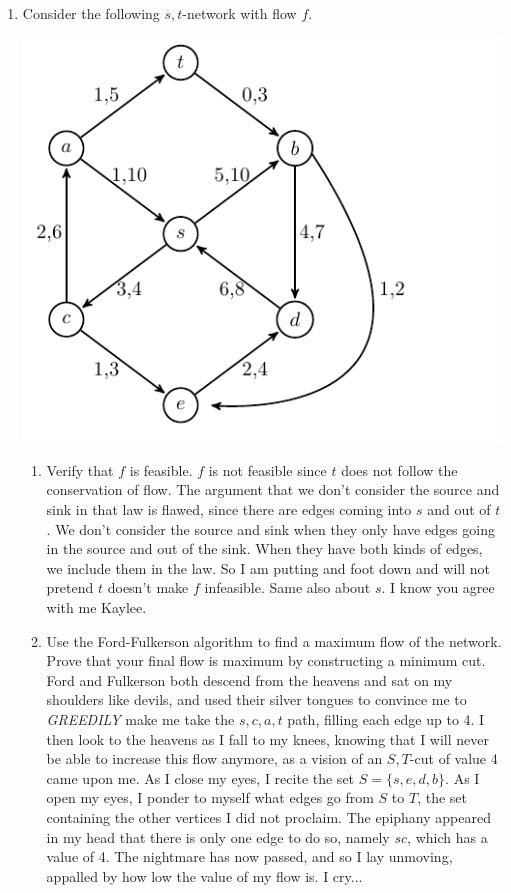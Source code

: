 \documentclass[12pt]{article}
\begin{document}
\begin{enumerate}
\medskip 

\item Consider the following $s,t$-network with flow $f$.
\begin{center}
\includegraphics[scale=1]{7_1.pdf}
\end{center}
\begin{enumerate}
\item Verify that $f$ is feasible.\m
$f$ is not feasible since $t$ does not follow the conservation of flow. The argument that we don't consider the source and sink in that law is flawed, since there are edges coming into $s$ and out of $t$. We don't consider the source and sink when they only have edges going in the source and out of the sink. When they have both kinds of edges, we include them in the law. So I am putting and foot down and will not pretend $t$ doesn't make $f$ infeasible. Same also about $s$. I know you agree with me Kaylee.
\item Use the Ford-Fulkerson algorithm to find a maximum flow of the network. Prove that your final flow is maximum by constructing a minimum cut. \m
Ford and Fulkerson both descend from the heavens and sat on my shoulders like devils, and used their silver tongues to convince me to \emph{GREEDILY} make me take the $s,c,a,t$ path, filling each edge up to 4. I then look to the heavens as I fall to my knees, knowing that I will never be able to increase this flow anymore, as a vision of an $S,T$-cut of value 4 came upon me. As I close my eyes, I recite the set $S=\{s,e,d,b\}$. As I open my eyes, I ponder to myself what edges go from $S$ to $T$, the set containing the other vertices I did not proclaim. The epiphany appeared in my head that there is only one edge to do so, namely $sc$, which has a value of 4. The nightmare has now passed, and so I lay unmoving, appalled by how low the value of my flow is. I cry...
\end{enumerate}


\end{enumerate}
\end{document}
